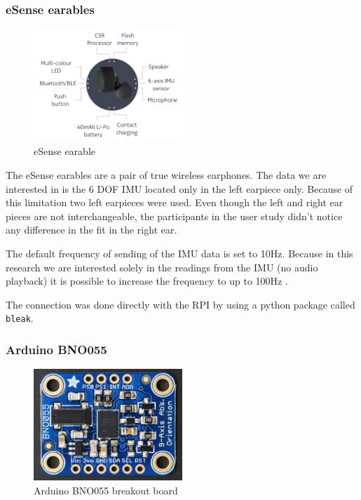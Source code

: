 \subsubsection{eSense earables}
\label{subsub:esense}

\begin{figure}[h!]
\centering
\includegraphics[width=0.5\textwidth]{src/media/hardware/esense.png}
\caption{eSense earable \cite{min2018exploring, kawsar2018earables}}
\label{image:esense}
\end{figure}

The eSense earables are a pair of true wireless earphones. The data we are interested in is the 6 DOF IMU located only in the left earpiece only. Because of this limitation two left earpieces were used. Even though the left and right ear pieces are not interchangeable, the participants in the user study didn't notice any difference in the fit in the right ear.

The default frequency of sending of the IMU data is set to 10Hz. Because in this research we are interested solely in the readings from the IMU (no audio playback) it is possible to increase the frequency to up to 100Hz \cite{esense_ble_specification}.

The connection was done directly with the RPI by using a python package called \texttt{bleak}.


\subsubsection{Arduino BNO055}
\label{subsub:bno}

\begin{figure}[h!]
\centering
\includegraphics[width=0.5\textwidth]{src/media/hardware/bno.jpg}
\caption{Arduino BNO055 breakout board}
\label{image:bno}
\end{figure}

